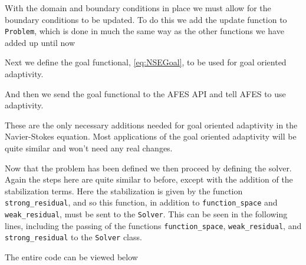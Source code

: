     With the domain and boundary conditions in place we must allow for the
    boundary conditions to be updated. To do this we add the update function to
    \texttt{Problem}, which is done in much the same way as the other functions
    we have added up until now
    
    

    Next we define the goal functional, \eqref{eq:NSEGoal}, to be used for goal
    oriented adaptivity.
    
    And then we send the goal functional to the AFES API and tell AFES to use
    adaptivity.
    
    
    These are the only necessary additions needed for goal oriented adaptivity
    in the Navier-Stokes equation. Most applications of the goal oriented
    adaptivity will be quite similar and won't need any real changes.

    Now that the problem has been defined we then proceed by defining the
    solver. Again the steps here are quite similar to before, except with the
    addition of the stabilization terms. Here the stabilization is given by the
    function \texttt{strong\_residual}, and so this function, in addition to
    \texttt{function\_space} and \texttt{weak\_residual}, must be sent to the
    \texttt{Solver}. This can be seen in the following lines, including the
    passing of the functions \texttt{function\_space}, \texttt{weak\_residual},
    and \texttt{strong\_residual} to the \texttt{Solver} class.
    
    

    The entire code can be viewed below
    

